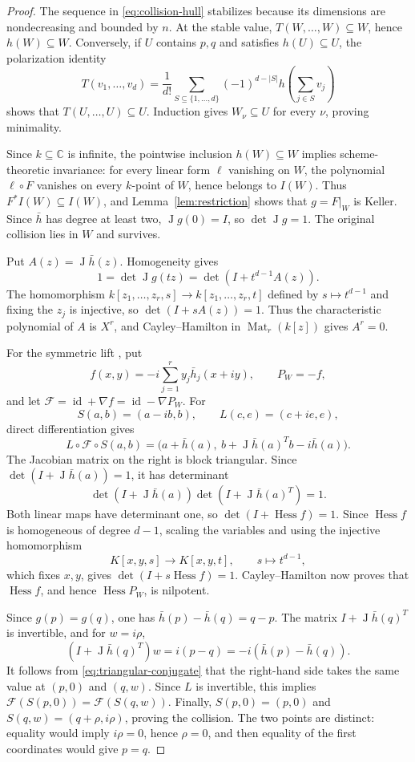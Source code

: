 \documentclass[11pt]{article}
\theoremstyle{remark}
\DeclareMathOperator{\Hess}{Hess}
\DeclareMathOperator{\J}{J}
\newcommand{\C}{\mathbb{C}}
\newcommand{\id}{\operatorname{id}}
\begin{document}
\begin{proof}
The sequence in \eqref{eq:collision-hull} stabilizes because its dimensions are nondecreasing and bounded by $n$. At the stable value, $T(W,\ldots,W)\subseteq W$, hence $h(W)\subseteq W$. Conversely, if $U$ contains $p,q$ and satisfies $h(U)\subseteq U$, the polarization identity
\[
T(v_1,\ldots,v_d)=\frac1{d!}\sum_{S\subseteq\{1,\ldots,d\}}(-1)^{d-|S|}
 h\left(\sum_{j\in S}v_j\right)
\]
shows that $T(U,\ldots,U)\subseteq U$. Induction gives $W_\nu\subseteq U$ for every $\nu$, proving minimality.

Since $k\subseteq\C$ is infinite, the pointwise inclusion $h(W)\subseteq W$ implies scheme-theoretic invariance: for every linear form $\ell$ vanishing on $W$, the polynomial $\ell\circ F$ vanishes on every $k$-point of $W$, hence belongs to $I(W)$. Thus $F^*I(W)\subseteq I(W)$, and Lemma~\ref{lem:restriction} shows that $g=F|_W$ is Keller. Since $\bar h$ has degree at least two, $\J g(0)=I$, so $\det\J g=1$. The original collision lies in $W$ and survives.

Put $A(z)=\J\bar h(z)$. Homogeneity gives
\[
1=\det\J g(tz)=\det(I+t^{d-1}A(z)).
\]
The homomorphism $k[z_1,\ldots,z_r,s]\to k[z_1,\ldots,z_r,t]$ defined by $s\mapsto t^{d-1}$ and fixing the $z_j$ is injective, so $\det(I+sA(z))=1$. Thus the characteristic polynomial of $A$ is $X^r$, and Cayley--Hamilton in $\operatorname{Mat}_r(k[z])$ gives $A^r=0$.

For the symmetric lift \citep{deBondtEssen2005a}, put
\[
f(x,y)=-i\sum_{j=1}^r y_j\bar h_j(x+iy),\qquad P_W=-f,
\]
and let $\mathcal F=\id+\nabla f=\id-\nabla P_W$. For
\[
S(a,b)=(a-ib,b),\qquad L(c,e)=(c+ie,e),
\]
direct differentiation gives
\begin{equation}\label{eq:triangular-conjugate}
L\circ\mathcal F\circ S(a,b)=
\bigl(a+\bar h(a),\ b+\J\bar h(a)^Tb-i\bar h(a)\bigr).
\end{equation}
The Jacobian matrix on the right is block triangular. Since $\det(I+\J\bar h(a))=1$, it has determinant
\[
\det(I+\J\bar h(a))\det(I+\J\bar h(a)^T)=1.
\]
Both linear maps have determinant one, so $\det(I+\Hess f)=1$. Since $\Hess f$ is homogeneous of degree $d-1$, scaling the variables and using the injective homomorphism
\[
K[x,y,s]\longrightarrow K[x,y,t],\qquad s\longmapsto t^{d-1},
\]
which fixes $x,y$, gives $\det(I+s\Hess f)=1$. Cayley--Hamilton now proves that $\Hess f$, and hence $\Hess P_W$, is nilpotent.

Since $g(p)=g(q)$, one has $\bar h(p)-\bar h(q)=q-p$. The matrix $I+\J\bar h(q)^T$ is invertible, and for $w=i\rho$,
\[
(I+\J\bar h(q)^T)w=i(p-q)=-i(\bar h(p)-\bar h(q)).
\]
It follows from \eqref{eq:triangular-conjugate} that the right-hand side takes the same value at $(p,0)$ and $(q,w)$. Since $L$ is invertible, this implies $\mathcal F(S(p,0))=\mathcal F(S(q,w))$. Finally, $S(p,0)=(p,0)$ and $S(q,w)=(q+\rho,i\rho)$, proving the collision. The two points are distinct: equality would imply $i\rho=0$, hence $\rho=0$, and then equality of the first coordinates would give $p=q$.


\end{proof}
\end{document}
